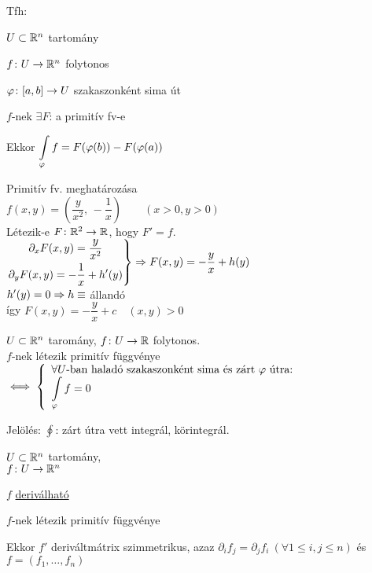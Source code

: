 \begin{te}
  Tfh:
\begin{enumzjromai}
  \item $U\subset \mathbb{R}^n$ tartomány
  \item $f\colon U\to \mathbb{R}^n$ folytonos
  \item $\varphi\colon [a,b]\to U$ szakaszonként sima út
  \item $f$-nek $\exists F$: a primitív fv-e
\end{enumzjromai}
Ekkor $\di\Int_\vfi f = F(\vfi(b))-F(\vfi(a))$
\end{te}

\begin{pl}
  Primitív fv. meghatározása\\
  $f(x,y) = \left(\dfrac{y}{x^2},\,-\dfrac1x\right)\qquad(x>0,y>0)$\\
  Létezik-e $F\colon \mathbb{R}^2\to\mathbb{R}$, hogy $F'=f$.\\
  $\left.\!\begin{gathered}\partial_xF(x,y) = \dfrac{y}{x^2}\\\partial_yF(x,y)=-\dfrac1x+h'(y)\end{gathered}
  \right\}\Rightarrow F(x,y) = -\dfrac y x+h(y)$\\
  $h'(y) = 0\Rightarrow h\equiv$ állandó\\
  így $F(x,y) = -\dfrac y x +c\quad (x,y)>0$
\end{pl}

\begin{te}
  $U\subset \mathbb{R}^n$ taromány, $f\colon U\to\mathbb{R}$ folytonos.\\
  $f$-nek létezik primitív függvénye $\ekviv \left\{\begin{array}{l}\forall U\text{-ban haladó szakaszonként sima és
  zárt }\vfi\text{ útra:}\\\di\Int_\vfi f= 0\end{array}\right.$
\end{te}

\begin{megj}Jelölés: $\oint$: zárt útra vett integrál, körintegrál.
\end{megj}

\begin{te}
  $U\subset\mathbb{R}^n$ tartomány,\\$f\colon U\to\mathbb{R}^n$
  \begin{enumzjr}
    \item $f$ \underline{deriválható}
    \item $f$-nek létezik primitív függvénye
  \end{enumzjr}
  Ekkor $f'$ deriváltmátrix szimmetrikus, azaz $\partial_if_j=\partial_jf_i\ (\forall 1\leq i,j\leq n)$ és
  $f=(f_1,\dotsc,f_n)$
\end{te}

